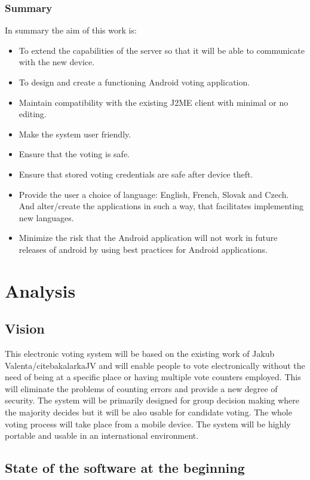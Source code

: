 \documentclass[11pt,twoside,a4paper]{book}
\begin{document}
\subsection{Summary}
In summary the aim of this work is:

\begin{itemize}
\item To extend the capabilities of the server so that it will be able to communicate with the new device.
\item To design and create a functioning Android voting application.
\item Maintain compatibility with the existing J2ME client with minimal or no editing.
\item Make the system user friendly.
\item Ensure that the voting is safe.
\item Ensure that stored voting credentials are safe after device theft.
\item Provide the user a choice of language: English, French, Slovak and Czech. And alter/create the applications in such a way, that facilitates implementing new languages.
\item Minimize the risk that the Android application will not work in future releases of android by using best practices for Android applications.
\end{itemize}
\chapter{Analysis}
\section{Vision}
This electronic voting system will be based on the existing work of Jakub Valenta/cite{bakalarkaJV} and will enable people to vote electronically without the need of being at a specific place or having multiple vote counters employed. This will eliminate the problems of counting errors and provide a new degree of security. The system will be primarily designed for group decision making where the majority decides but it will be also usable for candidate voting. The whole voting process will take place from a mobile device. The system will be highly portable and usable in an international environment.
\section{State of the software at the beginning}
\end{document}
